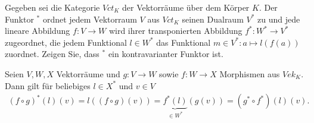 \begin{exercise}
    Gegeben sei die Kategorie $Vct_K$ der Vektorräume über dem Körper $K$. Der Funktor $^*$ ordnet jedem Vektorraum $V$ aus $Vct_K$ seinen Dualraum $V^*$ zu und jede lineare Abbildung $f:V \to W$ wird ihrer transponierten Abbildung $f^*: W^* \to V^*$ zugeordnet, die jedem Funktional $l \in W^*$ das Funktional $m \in V^* : a \mapsto l(f(a))$ zuordnet. Zeigen Sie, dass $^*$ ein kontravarianter Funktor ist.
\end{exercise}
\begin{solution}
    Seien $V, W, X$ Vektorräume und $g:V \to W$ sowie $f:W \to X$ Morphismen aus $Vek_K$. Dann gilt für beliebiges $l \in X^*$ und $v \in V$
    \begin{align*}
        (f \circ g)^*(l)(v) = l((f \circ g)(v)) = \underbrace{f^*(l)}_{\in W^*}(g(v)) = (g^* \circ f^*)(l)(v).
    \end{align*} 
\end{solution}